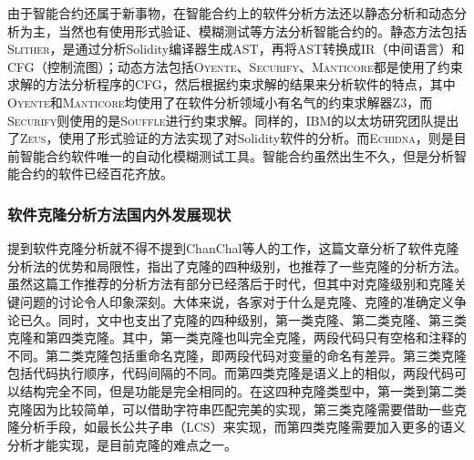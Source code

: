 由于智能合约还属于新事物，在智能合约上的软件分析方法还以静态分析和动态分析为主，当然也有使用形式验证、模糊测试等方法分析智能合约的。静态方法包括\textsc{Slither}\cite{slither}，是通过分析Solidity编译器生成AST，再将AST转换成IR（中间语言）和CFG（控制流图）；动态方法包括\textsc{Oyente}\cite{oyente}、\textsc{Securify}\cite{securify}、\textsc{Manticore}\cite{manticore}都是使用了约束求解的方法分析程序的CFG，然后根据约束求解的结果来分析软件的特点，其中\textsc{Oyente}和\textsc{Manticore}均使用了在软件分析领域小有名气的约束求解器Z3\cite{z3}，而\textsc{Securify}则使用的是\textsc{Souffle}\cite{souffle}进行约束求解。同样的，IBM的以太坊研究团队提出了\textsc{Zeus}\cite{zeus}，使用了形式验证的方法实现了对Solidity软件的分析。而\textsc{Echidna}\cite{echidna}，则是目前智能合约软件唯一的自动化模糊测试工具。智能合约虽然出生不久，但是分析智能合约的软件已经百花齐放。

%

\subsubsection{软件克隆分析方法国内外发展现状}\label{sec:clone_intro}
提到软件克隆分析就不得不提到ChanChal等人的工作\cite{survey-on-clone}，这篇文章分析了软件克隆分析法的优势和局限性，指出了克隆的四种级别，也推荐了一些克隆的分析方法。虽然这篇工作推荐的分析方法有部分已经落后于时代，但其中对克隆级别和克隆关键问题的讨论令人印象深刻。大体来说，各家对于什么是克隆、克隆的准确定义争论已久。同时，文中也支出了克隆的四种级别，第一类克隆、第二类克隆、第三类克隆和第四类克隆。其中，第一类克隆也叫完全克隆，两段代码只有空格和注释的不同。第二类克隆包括重命名克隆，即两段代码对变量的命名有差异。第三类克隆包括代码执行顺序，代码间隔的不同。而第四类克隆是语义上的相似，两段代码可以结构完全不同，但是功能是完全相同的。在这四种克隆类型中，第一类到第二类克隆因为比较简单，可以借助字符串匹配完美的实现，第三类克隆需要借助一些克隆分析手段，如最长公共子串（LCS）来实现，而第四类克隆需要加入更多的语义分析才能实现，是目前克隆的难点之一。

